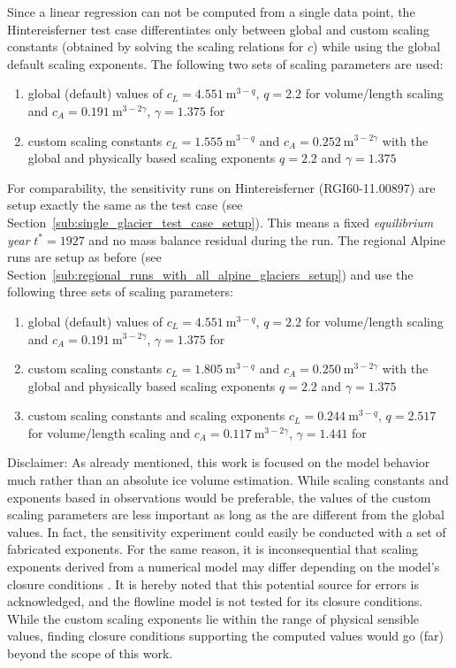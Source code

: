         Since a linear regression can not be computed from a single data point, the Hintereisferner test case differentiates only between global and custom scaling constants (obtained by solving the scaling relations for $c$) while using the global default scaling exponents. The following two sets of scaling parameters are used:
        \begin{enumerate}[label=(\alph*)]
            \item global (default) values of $c_L = \SI{4.551}{\meter^{3-q}}$, $q = 2.2$ for volume/length scaling and $c_A = \SI{0.191}{\meter^{3-2\gamma}}$, $\gamma = 1.375$ for \vas{}
            \item custom scaling constants $c_L = \SI{1.555}{\meter^{3-q}}$ and $c_A = \SI{0.252}{\meter^{3-2\gamma}}$ with the global and physically based scaling exponents $q = 2.2$ and $\gamma = 1.375$
        \end{enumerate}
        For comparability, the sensitivity runs on Hintereisferner (RGI60-11.00897) are setup exactly the same as the test case (see Section~\ref{sub:single_glacier_test_case_setup}). This means a fixed \textit{equilibrium year} $t^{*} = 1927$ and no mass balance residual during the run. The regional Alpine runs are setup as before (see Section~\ref{sub:regional_runs_with_all_alpine_glaciers_setup}) and use the following three sets of scaling parameters:
        \begin{enumerate}[label=(\alph*)]
            \item global (default) values of $c_L = \SI{4.551}{\meter^{3-q}}$, $q = 2.2$ for volume/length scaling and $c_A = \SI{0.191}{\meter^{3-2\gamma}}$, $\gamma = 1.375$ for \vas{}
            \item custom scaling constants $c_L = \SI{1.805}{\meter^{3-q}}$ and $c_A = \SI{0.250}{\meter^{3-2\gamma}}$ with the global and physically based scaling exponents $q = 2.2$ and $\gamma = 1.375$
            \item custom scaling constants and scaling exponents $c_L = \SI{0.244}{\meter^{3-q}}$, $q = 2.517$ for volume/length scaling and $c_A = \SI{0.117}{\meter^{3-2\gamma}}$, $\gamma = 1.441$ for \vas{}
        \end{enumerate}

        Disclaimer: As already mentioned, this work is focused on the model behavior much rather than an absolute ice volume estimation. While scaling constants and exponents based in observations would be preferable, the values of the custom scaling parameters are less important as long as the are different from the global values. In fact, the sensitivity experiment could easily be conducted with a set of fabricated exponents. For the same reason, it is inconsequential that scaling exponents derived from a numerical model may differ depending on the model's closure conditions \citep[Section 8.9]{Bahr2015}. It is hereby noted that this potential source for errors is acknowledged, and the flowline model is not tested for its closure conditions. While the custom scaling exponents lie within the range of physical sensible values, finding closure conditions supporting the computed values would go (far) beyond the scope of this work.

